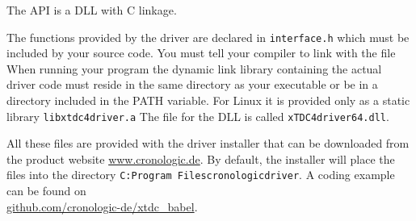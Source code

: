 
The API is a DLL with C linkage.\par

The functions provided by the driver are declared in
\texttt{\tu interface.h} 
which must be included by your source code.
You must tell your compiler to link with the file
When running your program the dynamic link library containing the actual
driver code must reside in the same directory as your executable or be in a
directory included in the PATH variable. For Linux it is provided only as a
static library \texttt{libxtdc4\tu driver.a} 
The file for the DLL is called \texttt{xTDC4\tu driver\tu 64.dll}.

All these files are provided with the driver installer that can be downloaded
from the product website \href{https://www.cronologic.de}{www.cronologic.de}. 
By default, the installer will place the files into the directory 
\texttt{C:\filesep Program Files\filesep cronologic\filesep \deviceName\filesep driver}.
A coding example can be found on\\
\href{https://github.com/cronologic-de/xtdc_babel/tree/main/timetagger4_user_guide_example}{github.com/cronologic-de/xtdc\_babel}.


 

